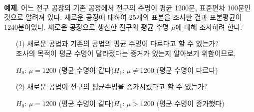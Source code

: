 \\
\textbf{예제}. 어느 전구 공장의 기존 공정에서 전구의 수명이 평균 1200분, 표준편차 100분인 것으로 알려져 있다. 새로운 공정에 대하여 25개의 표본을 조사한 결과 표본평균이 1240분이었다. 새로운 공정으로 생산한 전구의 평균 수명 $\mu$에 대해 조사하려 한다.
 \begin{itemize}
	\item[(1)] 새로운 공법과 기존의 공법의 평균 수명이 다르다고 할 수 있는가?\\ 조사의 목적이 평균 수명이 달라졌다는 증거가 있는지 알아보기 위함이므로, \vspace{-3mm}
	\begin{center}
		$H_0$: $\mu=1200$ (평균 수명이 같다)\qquad $H_1$: $\mu \neq 1200$ (평균 수명이 다르다)
	\end{center}\vspace{-3mm}
	\item[(2)] 새로운 공법이 전구의 평균수명을 증가시켰다고 할 수 있는가?\vspace{-3mm}
	\begin{center}
		$H_0$: $\mu=1200$ (평균 수명이 같다)\qquad $H_1$: $\mu > 1200$ (평균 수명이 증가했다)
	\end{center}\vspace{-3mm}
\end{itemize}~


